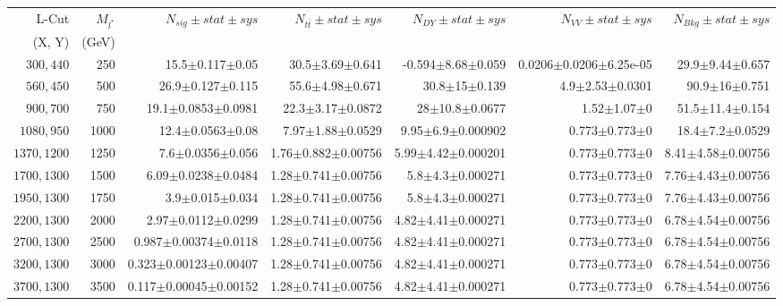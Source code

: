 \documentclass[]{article}
\begin{document}
\begin{table}
\begin{center}
\scriptsize{
\begin{tabular}{ |r|r|r|r|r|r|r|}
\hline 
L-Cut & $M_{l^*}$ & $N_{sig}\pm stat \pm sys $ &$N_{t\bar{t}}\pm stat \pm sys $ & $N_{DY}\pm stat \pm sys $ & $N_{VV}\pm stat \pm sys $ &$N_{Bkg}\pm stat \pm sys$\\
(X, Y) & (GeV) & && &&\\
\hline 
$300, 440$ & 250 & 15.5$\pm$0.117$\pm$0.05 & 30.5$\pm$3.69$\pm$0.641 & -0.594$\pm$8.68$\pm$0.059 & 0.0206$\pm$0.0206$\pm$6.25e-05 & 29.9$\pm$9.44$\pm$0.657 \\
$560, 450$ & 500 & 26.9$\pm$0.127$\pm$0.115 & 55.6$\pm$4.98$\pm$0.671 & 30.8$\pm$15$\pm$0.139 & 4.9$\pm$2.53$\pm$0.0301 & 90.9$\pm$16$\pm$0.751 \\
$900, 700$ & 750 & 19.1$\pm$0.0853$\pm$0.0981 & 22.3$\pm$3.17$\pm$0.0872 & 28$\pm$10.8$\pm$0.0677 & 1.52$\pm$1.07$\pm$0 & 51.5$\pm$11.4$\pm$0.154 \\
$1080,950$ & 1000 & 12.4$\pm$0.0563$\pm$0.08 & 7.97$\pm$1.88$\pm$0.0529 & 9.95$\pm$6.9$\pm$0.000902 & 0.773$\pm$0.773$\pm$0 & 18.4$\pm$7.2$\pm$0.0529 \\
$1370,1200$ & 1250 & 7.6$\pm$0.0356$\pm$0.056 & 1.76$\pm$0.882$\pm$0.00756 & 5.99$\pm$4.42$\pm$0.000201 & 0.773$\pm$0.773$\pm$0 & 8.41$\pm$4.58$\pm$0.00756 \\
$1700,1300$ & 1500 & 6.09$\pm$0.0238$\pm$0.0484 & 1.28$\pm$0.741$\pm$0.00756 & 5.8$\pm$4.3$\pm$0.000271 & 0.773$\pm$0.773$\pm$0 & 7.76$\pm$4.43$\pm$0.00756 \\
$1950,1300$ & 1750 & 3.9$\pm$0.015$\pm$0.034 & 1.28$\pm$0.741$\pm$0.00756 & 5.8$\pm$4.3$\pm$0.000271 & 0.773$\pm$0.773$\pm$0 & 7.76$\pm$4.43$\pm$0.00756 \\
$2200,1300$ & 2000 & 2.97$\pm$0.0112$\pm$0.0299 & 1.28$\pm$0.741$\pm$0.00756 & 4.82$\pm$4.41$\pm$0.000271 & 0.773$\pm$0.773$\pm$0 & 6.78$\pm$4.54$\pm$0.00756 \\
$2700,1300$ & 2500 & 0.987$\pm$0.00374$\pm$0.0118 & 1.28$\pm$0.741$\pm$0.00756 & 4.82$\pm$4.41$\pm$0.000271 & 0.773$\pm$0.773$\pm$0 & 6.78$\pm$4.54$\pm$0.00756 \\
$3200,1300$ & 3000 & 0.323$\pm$0.00123$\pm$0.00407 & 1.28$\pm$0.741$\pm$0.00756 & 4.82$\pm$4.41$\pm$0.000271 & 0.773$\pm$0.773$\pm$0 & 6.78$\pm$4.54$\pm$0.00756 \\
$3700,1300$ & 3500 & 0.117$\pm$0.00045$\pm$0.00152 & 1.28$\pm$0.741$\pm$0.00756 & 4.82$\pm$4.41$\pm$0.000271 & 0.773$\pm$0.773$\pm$0 & 6.78$\pm$4.54$\pm$0.00756 \\

\end{tabular}}
\end{center}
\end{table}
\end{document}
